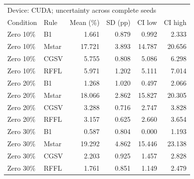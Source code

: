 \begin{tabular}{llrrrr}
\toprule
\multicolumn{6}{l}{Device: CUDA; uncertainty across complete seeds} \\
Condition & Rule & Mean (\%) & SD (pp) & CI low & CI high \\
\midrule
Zero 10\% & B1 & 1.661 & 0.879 & 0.992 & 2.333 \\
Zero 10\% & Mstar & 17.721 & 3.893 & 14.787 & 20.656 \\
Zero 10\% & CGSV & 5.755 & 0.808 & 5.086 & 6.298 \\
Zero 10\% & RFFL & 5.971 & 1.202 & 5.111 & 7.014 \\
Zero 20\% & B1 & 1.268 & 1.020 & 0.497 & 2.066 \\
Zero 20\% & Mstar & 18.066 & 2.862 & 15.827 & 20.305 \\
Zero 20\% & CGSV & 3.288 & 0.716 & 2.747 & 3.828 \\
Zero 20\% & RFFL & 3.157 & 0.625 & 2.660 & 3.654 \\
Zero 30\% & B1 & 0.587 & 0.804 & 0.000 & 1.193 \\
Zero 30\% & Mstar & 19.292 & 4.862 & 15.446 & 23.138 \\
Zero 30\% & CGSV & 2.203 & 0.925 & 1.457 & 2.828 \\
Zero 30\% & RFFL & 1.761 & 0.851 & 1.149 & 2.479 \\
\bottomrule
\end{tabular}
